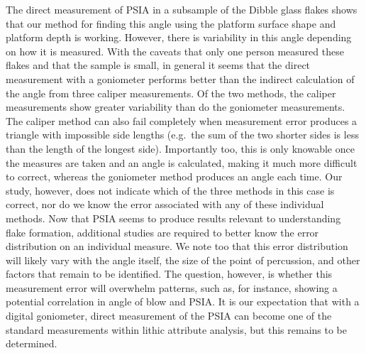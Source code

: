 \documentclass[10pt,letterpaper]{article}
\begin{document}
The direct measurement of PSIA in a subsample of the Dibble glass flakes
shows that our method for finding this angle using the platform surface
shape and platform depth is working. However, there is variability in
this angle depending on how it is measured. With the caveats that only
one person measured these flakes and that the sample is small, in
general it seems that the direct measurement with a goniometer performs
better than the indirect calculation of the angle from three caliper
measurements. Of the two methods, the caliper measurements show greater
variability than do the goniometer measurements. The caliper method can
also fail completely when measurement error produces a triangle with
impossible side lengths (e.g.~the sum of the two shorter sides is less
than the length of the longest side). Importantly too, this is only
knowable once the measures are taken and an angle is calculated, making
it much more difficult to correct, whereas the goniometer method
produces an angle each time. Our study, however, does not indicate which
of the three methods in this case is correct, nor do we know the error
associated with any of these individual methods. Now that PSIA seems to
produce results relevant to understanding flake formation, additional
studies are required to better know the error distribution on an
individual measure. We note too that this error distribution will likely
vary with the angle itself, the size of the point of percussion, and
other factors that remain to be identified. The question, however, is
whether this measurement error will overwhelm patterns, such as, for
instance, showing a potential correlation in angle of blow and PSIA. It
is our expectation that with a digital goniometer, direct measurement of
the PSIA can become one of the standard measurements within lithic
attribute analysis, but this remains to be determined.
\end{document}
